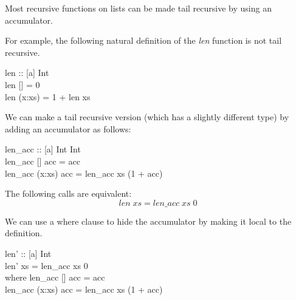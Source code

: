 \documentclass[11pt]{article}
\begin{document}
Most recursive functions on lists can be made tail recursive by using an
accumulator.

For example, the following natural definition of the {\it{len}} function is not tail recursive.

\begin{program**}
\> len :: [a] \arrow Int\\
\> len [] = 0\\
\> len (x:xs) = 1 + len xs\\
\end{program**}

We can make a tail recursive version (which has a slightly different type) by
adding an accumulator as follows:

\begin{program**}
\> len\_acc :: [a] \arrow Int \arrow Int\\
\> len\_acc [] acc = acc\\
\> len\_acc (x:xs) acc = len\_acc xs (1 + acc)\\
\end{program**}

\noindent{}The following calls are equivalent:
\[ len\; xs = len\_acc\;xs\; 0\]

\noindent{}We can use a where clause to hide the accumulator by making it local to the definition.

\begin{program**}
\> len' :: [a] \arrow Int\\
\> len' xs = len\_acc xs 0\\
\>    where len\_acc [] acc = acc\\
\>            len\_acc (x:xs) acc = len\_acc xs (1 + acc)\\
\end{program**}




\end{document}
